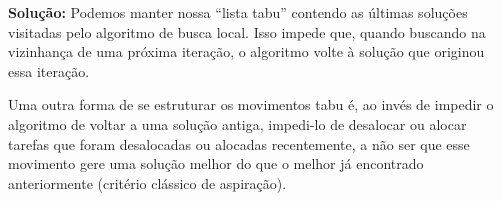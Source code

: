 \noindent \textbf{Solução:}
Podemos manter nossa ``lista tabu'' contendo as últimas soluções visitadas pelo algoritmo de busca local. Isso impede que, quando buscando na vizinhança de uma próxima iteração, o algoritmo volte à solução que originou essa iteração.

Uma outra forma de se estruturar os movimentos tabu é, ao invés de impedir o algoritmo de voltar a uma solução antiga, impedi-lo de desalocar ou alocar tarefas que foram desalocadas ou alocadas recentemente, a não ser que esse movimento gere uma solução melhor do que o melhor já encontrado anteriormente (critério clássico de aspiração).

